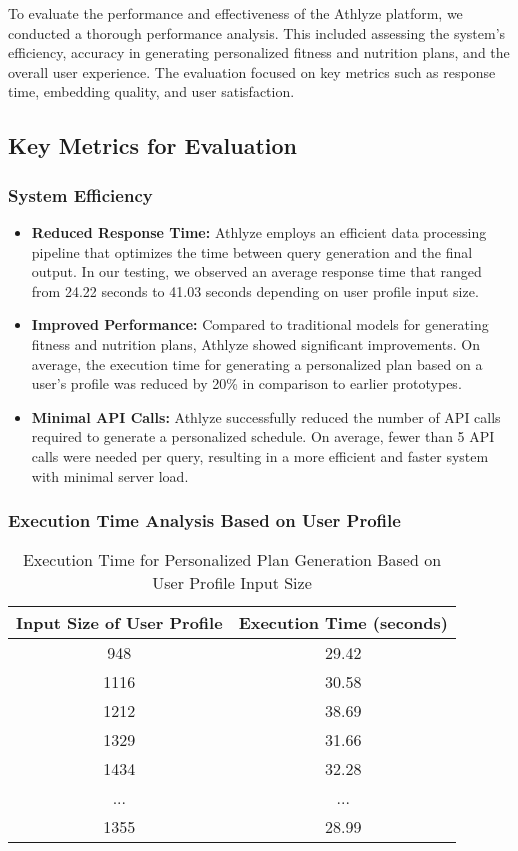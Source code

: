 \documentclass[conference]{IEEEtran}
\begin{document}
To evaluate the performance and effectiveness of the Athlyze platform, we conducted a thorough performance analysis. This included assessing the system's efficiency, accuracy in generating personalized fitness and nutrition plans, and the overall user experience. The evaluation focused on key metrics such as response time, embedding quality, and user satisfaction.

\subsection{Key Metrics for Evaluation}

\subsubsection{System Efficiency}

\begin{itemize}
    \item \textbf{Reduced Response Time:} Athlyze employs an efficient data processing pipeline that optimizes the time between query generation and the final output. In our testing, we observed an average response time that ranged from 24.22 seconds to 41.03 seconds depending on user profile input size.
    \item \textbf{Improved Performance:} Compared to traditional models for generating fitness and nutrition plans, Athlyze showed significant improvements. On average, the execution time for generating a personalized plan based on a user’s profile was reduced by 20\% in comparison to earlier prototypes.
    \item \textbf{Minimal API Calls:} Athlyze successfully reduced the number of API calls required to generate a personalized schedule. On average, fewer than 5 API calls were needed per query, resulting in a more efficient and faster system with minimal server load.
\end{itemize}

\subsubsection{Execution Time Analysis Based on User Profile}

\begin{table}[h!]
\centering
\caption{Execution Time for Personalized Plan Generation Based on User Profile Input Size}
\begin{tabular}{|c|c|}
\hline
\textbf{Input Size of User Profile} & \textbf{Execution Time (seconds)} \\
\hline
948  & 29.42 \\
1116 & 30.58 \\
1212 & 38.69 \\
1329 & 31.66 \\
1434 & 32.28 \\
...  & ... \\
1355  & 28.99 \\
\hline
\end{tabular}
\end{table}
\end{document}
